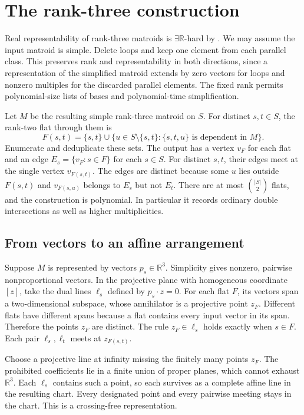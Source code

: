 \documentclass[11pt,a4paper]{amsart}
\newcommand{\ER}{\ensuremath{\exists\mathbb R}}
\begin{document}
\section{The rank-three construction}
Real representability of rank-three matroids is \ER-hard by \cite[Theorem~1]{kim}. We may assume the input matroid is simple. Delete loops and keep one element from each parallel class. This preserves rank and representability in both directions, since a representation of the simplified matroid extends by zero vectors for loops and nonzero multiples for the discarded parallel elements. The fixed rank permits polynomial-size lists of bases and polynomial-time simplification.

Let $M$ be the resulting simple rank-three matroid on $S$. For distinct $s,t\in S$, the rank-two flat through them is
\[
 F(s,t)=\{s,t\}\cup\{u\in S\setminus\{s,t\}:\{s,t,u\}\text{ is dependent in }M\}.
\]
Enumerate and deduplicate these sets. The output has a vertex $v_F$ for each flat and an edge $E_s=\{v_F:s\in F\}$ for each $s\in S$. For distinct $s,t$, their edges meet at the single vertex $v_{F(s,t)}$. The edges are distinct because some $u$ lies outside $F(s,t)$ and $v_{F(s,u)}$ belongs to $E_s$ but not $E_t$. There are at most $\binom{|S|}{2}$ flats, and the construction is polynomial. In particular it records ordinary double intersections as well as higher multiplicities.

\subsection{From vectors to an affine arrangement}
Suppose $M$ is represented by vectors $p_s\in\mathbb R^3$. Simplicity gives nonzero, pairwise nonproportional vectors. In the projective plane with homogeneous coordinate $[z]$, take the dual lines $\ell_s$ defined by $p_s\cdot z=0$. For each flat $F$, its vectors span a two-dimensional subspace, whose annihilator is a projective point $z_F$. Different flats have different spans because a flat contains every input vector in its span. Therefore the points $z_F$ are distinct. The rule $z_F\in\ell_s$ holds exactly when $s\in F$. Each pair $\ell_s,\ell_t$ meets at $z_{F(s,t)}$.

Choose a projective line at infinity missing the finitely many points $z_F$. The prohibited coefficients lie in a finite union of proper planes, which cannot exhaust $\mathbb R^3$. Each $\ell_s$ contains such a point, so each survives as a complete affine line in the resulting chart. Every designated point and every pairwise meeting stays in the chart. This is a crossing-free representation.
\end{document}
